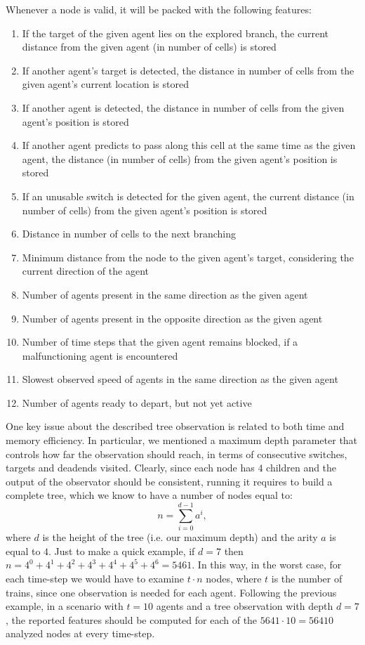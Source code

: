\documentclass[a4paper,10pt]{report}
\begin{document}
Whenever a node is valid, it will be packed with the following features:
\begin{enumerate}
	\item If the target of the given agent lies on the explored branch, the current distance from the given agent (in number of cells) is stored
	\item If another agent's target is detected, the distance in number of cells from the given agent's current location is stored
	\item If another agent is detected, the distance in number of cells from the given agent's position is stored
	\item If another agent predicts to pass along this cell at the same time as the given agent, the distance (in number of cells) from the given agent's position is stored
	\item If an unusable switch is detected for the given agent, the current distance (in number of cells) from the given agent's position is stored
	\item Distance in number of cells to the next branching
	\item Minimum distance from the node to the given agent's target, considering the current direction of the agent
	\item Number of agents present in the same direction as the given agent
	\item Number of agents present in the opposite direction as the given agent
	\item Number of time steps that the given agent remains blocked, if a malfunctioning agent is encountered
	\item Slowest observed speed of agents in the same direction as the given agent
	\item Number of agents ready to depart, but not yet active
\end{enumerate}

One key issue about the described tree observation is related to both time and memory efficiency. In particular, we mentioned a maximum depth parameter that controls how far the observation should reach, in terms of consecutive switches, targets and deadends visited. Clearly, since each node has $4$ children and the output of the observator should be consistent, running it requires to build a complete tree, which we know to have a number of nodes equal to:
$$
n = \sum_{i=0}^{d-1}a^i,
$$
where $d$ is the height of the tree (i.e. our maximum depth) and the arity $a$ is equal to $4$. Just to make a quick example, if $d=7$ then $n=4^0+4^1+4^2+4^3+4^4+4^5+4^6=\num{5461}$. In this way, in the worst case, for each time-step we would have to examine $t\cdot n$ nodes, where $t$ is the number of trains, since one observation is needed for each agent. Following the previous example, in a scenario with $t=10$ agents and a tree observation with depth $d=7$, the reported features should be computed for each of the $\num{5641}\cdot 10=\num{56410}$ analyzed nodes at every time-step. 
\end{document}
